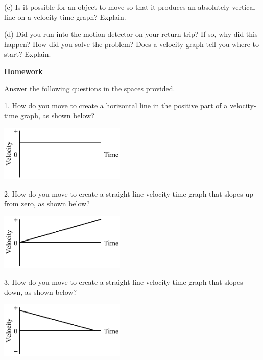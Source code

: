 (c) Is it possible for an object to move so that it produces an absolutely vertical
line on a velocity-time graph? Explain.
\answerspace{25mm}

(d) Did you run into the motion detector on your return trip? If so, why did
this happen? How did you solve the problem? Does a velocity graph tell you where
to start? Explain.
\answerspace{25mm}

\pagebreak[2]
\textbf{Homework} 

Answer the following questions in the spaces provided.

1. How do you move to create a horizontal line in the positive part of a velocity-time
graph, as shown below?

\vspace{0.3cm}
{\par\raggedright \includegraphics[width=0.45\textwidth]{velocity/velocity_fig8.eps} \par}
\answerspace{0.3cm}

2. How do you move to create a straight-line velocity-time graph that slopes
up from zero, as shown below?

\vspace{0.3cm}
{\par\raggedright \includegraphics[width=0.45\textwidth]{velocity/velocity_fig9.eps} \par}
\answerspace{0.3cm}

3. How do you move to create a straight-line velocity-time graph that slopes
down, as shown below?

\vspace{0.3cm}
{\par\raggedright \includegraphics[width=0.45\textwidth]{velocity/velocity_fig10.eps} \par}
\answerspace{0.3cm}


